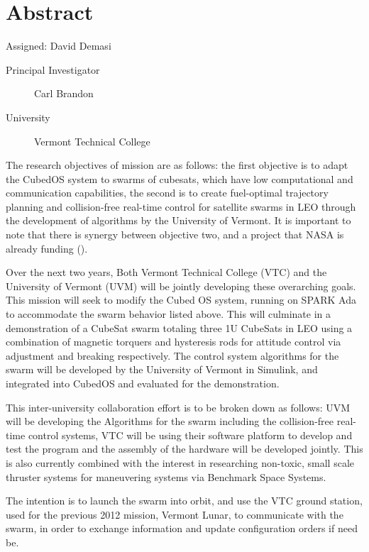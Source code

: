 \section{Abstract}
Assigned: David Demasi \cite{brandon:2008}

\begin{description}
\item[Principal Investigator] Carl Brandon
\item[University] Vermont Technical College
\end{description}

The research objectives of mission are as follows:  the first objective is to adapt the CubedOS system to swarms of cubesats, which have low computational and communication capabilities, the second is to create fuel-optimal trajectory planning and collision-free real-time control for satellite swarms in LEO through the development of algorithms by the University of Vermont. It is important to note that there is synergy between objective two, and a project that NASA is already funding (\cite{ossareh:2019}).

Over the next two years, Both Vermont Technical College (VTC) and the University of Vermont (UVM) will be jointly developing these overarching goals. This mission will seek to modify the Cubed OS system, running on SPARK Ada to accommodate the swarm behavior listed above. This will culminate in a demonstration of a CubeSat swarm totaling three 1U CubeSats in LEO using a combination of magnetic torquers and hysteresis rods for attitude control via adjustment and breaking respectively. The control system algorithms for the swarm will be developed by the University of Vermont in Simulink, and integrated into CubedOS and evaluated for the demonstration.

This inter-university collaboration effort is to be broken down as follows: UVM will be developing the Algorithms for the swarm including the collision-free real-time control systems, VTC will be using their software platform to develop and test the program and the assembly of the hardware will be developed jointly. This is also currently combined with the interest in researching non-toxic, small scale thruster systems for maneuvering systems via Benchmark Space Systems.

The intention is to launch the swarm into orbit, and use the VTC ground station, used for the previous 2012 mission, Vermont Lunar, to communicate with the swarm, in order to exchange information and update configuration orders if need be. 
	

